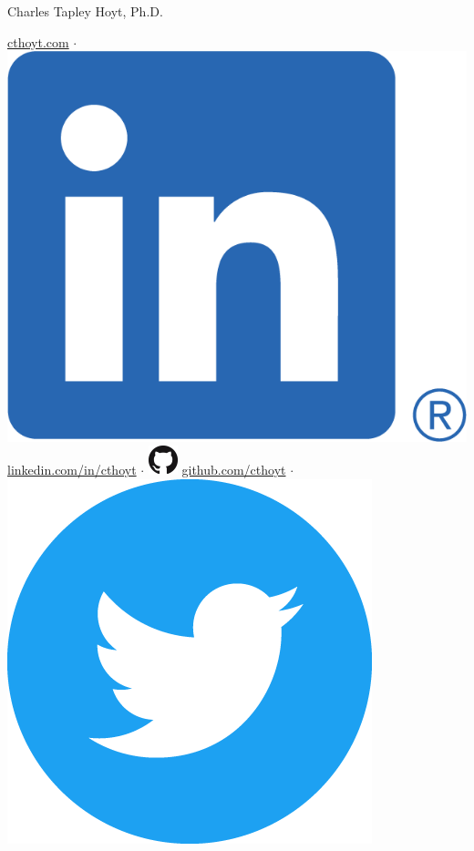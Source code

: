 \documentclass[11pt,a4paper,sans]{moderncv} %
\begin{document}
{\Huge Charles Tapley Hoyt, Ph.D.}

    \vspace{3mm}

    \href{https://cthoyt.com}{cthoyt.com}
    $\cdot$
    \includegraphics[scale=0.055]{img/LI-In-Bug.png}
    \href{https://linkedin.com/in/cthoyt}{linkedin.com/in/cthoyt}
    $\cdot$
    \includegraphics[scale=0.25]{img/GitHub-Mark-32px.png}
    \href{https://github.com/cthoyt}{github.com/cthoyt}
    $\cdot$
    \includegraphics[scale=0.02]{img/Twitter_Social_Icon_Circle_Color.png}
\end{document}
